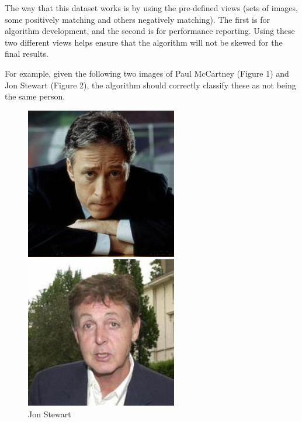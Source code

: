 \documentclass[12pt, a4paper]{article}
\begin{document}
The way that this dataset works is by using the pre-defined views (sets of images, some positively matching and others negatively matching). The first is for algorithm development, and the second is for performance reporting. Using these two different views helps ensure that the algorithm will not be skewed for the final results.

For example, given the following two images of Paul McCartney (Figure 1) and Jon Stewart (Figure 2), the algorithm should correctly classify these as not being the same person. 

\begin{figure}[H]
  \includegraphics[width=\linewidth]{images/Jon_Stewart_0001.jpg}
  \caption{Jon Stewart}
\endminipage\hfill
{}
  \includegraphics[width=\linewidth]{images/Paul_McCartney_0004.jpg}

\end{figure}
\end{document}
